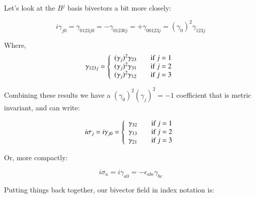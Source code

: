 
Let's look at the $B^j$ basis bivectors a bit more closely:

\begin{equation*}
i\gamma_{j0}
= \gamma_{0123j0}
= -\gamma_{01230j}
= +\gamma_{00123j}
= (\gamma_0)^2 \gamma_{123j}
\end{equation*}

Where,
\begin{equation*}
\gamma_{123j} =
\left\{
\begin{array}{l l}
(\gamma_{j})^2 \gamma_{23} & \quad \mbox{if $j = 1$} \\
(\gamma_{j})^2 \gamma_{31} & \quad \mbox{if $j = 2$} \\
(\gamma_{j})^2 \gamma_{12} & \quad \mbox{if $j = 3$} \\
\end{array} \right.
\end{equation*}

Combining these results we have a $(\gamma_0)^2 (\gamma_{j})^2 = -1$ coefficient that is metric invariant, and can write:

\begin{equation*}
i \sigma_{j} =
i \gamma_{j0} =
\left\{
\begin{array}{l l}
\gamma_{32} & \quad \mbox{if $j = 1$} \\
\gamma_{13} & \quad \mbox{if $j = 2$} \\
\gamma_{21} & \quad \mbox{if $j = 3$} \\
\end{array} \right.
\end{equation*}


Or, more compactly:

\begin{equation*}
i \sigma_{a} =
i \gamma_{a0} =
-\epsilon_{abc} \gamma_{bc}
\end{equation*}

Putting things back together, our bivector field in index notation is:

